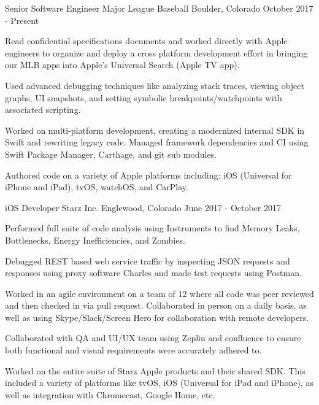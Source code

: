 \begin{cventries}
  \cventry
    {Senior Software Engineer}
    {Major League Baseball}
    {Boulder, Colorado}
    {October 2017 - Present}
    {
      \begin{cvitems}
      \begin{footnotesize}
        \item {Read confidential specifications documents and worked directly with Apple engineers to organize and deploy a cross platform development effort in bringing our MLB apps into Apple's Universal Search (Apple TV app).}
        \item {Used advanced debugging techniques like analyzing stack traces, viewing object graphs, UI snapshots, and setting symbolic breakpoints/watchpoints with associated scripting.}
        \item {Worked on multi-platform development, creating a modernized internal SDK in Swift and rewriting legacy code. Managed framework dependencies and CI using Swift Package Manager, Carthage, and git sub modules.}
        \item {Authored code on a variety of Apple platforms including: iOS (Universal for iPhone and iPad), tvOS, watchOS, and CarPlay.}
        \end{footnotesize} 
      \end{cvitems}
    }
  \cventry
    {iOS Developer}
    {Starz Inc.}
    {Englewood, Colorado}
    {June 2017 - October 2017}
    {
      \begin{cvitems}
      \begin{footnotesize}
        \item {Performed full suite of code analysis using Instruments to find Memory Leaks, Bottlenecks, Energy Inefficiencies, and Zombies.}
        \item {Debugged REST based web service traffic by inspecting JSON requests and responses using proxy software Charles and made test requests using Postman.}
        \item {Worked in an agile environment on a team of 12 where all code was peer reviewed and then checked in via pull request. Collaborated in person on a daily basis, as well as using Skype/Slack/Screen Hero for collaboration with remote developers.}
        \item {Collaborated with QA and UI/UX team using Zeplin and confluence to ensure both functional and visual requirements were accurately adhered to.}
        \item {Worked on the entire suite of Starz Apple products and their shared SDK. This included a variety of platforms like tvOS, iOS (Universal for iPad and iPhone), as well as integration with Chromecast, Google Home, etc.}

\end{footnotesize}
\end{cvitems}}
\end{cventries}
